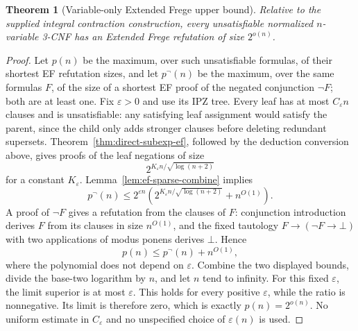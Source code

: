 \documentclass[11pt]{article}
\newtheorem{theorem}{Theorem}[section]
\theoremstyle{definition}
\theoremstyle{remark}
\begin{document}
\begin{theorem}[Variable-only Extended Frege upper bound]
\label{thm:all-3cnf-ef}
Relative to the supplied integral contraction construction, every
unsatisfiable normalized $n$-variable 3-CNF has an Extended Frege
refutation of size $2^{o(n)}$.
\end{theorem}
\begin{proof}
Let $p(n)$ be the maximum, over such unsatisfiable formulas, of
their shortest EF refutation sizes, and let $p^{\neg}(n)$ be the
maximum, over the same formulas $F$, of the size of a shortest EF
proof of the negated conjunction $\neg F$; both are at least one. Fix
$\varepsilon>0$ and use its IPZ tree. Every leaf has at most
$C_\varepsilon n$ clauses and is unsatisfiable: any satisfying
leaf assignment would satisfy the parent, since the child only
adds stronger clauses before deleting redundant supersets.
Theorem~\ref{thm:direct-subexp-ef}, followed by the deduction
conversion above, gives proofs of the leaf negations of size
\[
 2^{K_\varepsilon n/\sqrt{\log(n+2)}}
\]
for a constant $K_\varepsilon$. Lemma~\ref{lem:ef-sparse-combine}
implies
\[
 p^{\neg}(n)\le
 2^{\varepsilon n}
 \left(2^{K_\varepsilon n/\sqrt{\log(n+2)}}+n^{O(1)}\right).
\]
A proof of $\neg F$ gives a refutation from the clauses of $F$:
conjunction introduction derives $F$ from its clauses in size
$n^{O(1)}$, and the fixed tautology $F\to(\neg F\to\bot)$ with two
applications of modus ponens derives $\bot$. Hence
\[
 p(n)\le p^{\neg}(n)+n^{O(1)},
\]
where the polynomial does not depend on $\varepsilon$. Combine the
two displayed bounds, divide the base-two logarithm by $n$, and let
$n$ tend to infinity. For this fixed $\varepsilon$, the limit superior is
at most $\varepsilon$. This holds for every positive
$\varepsilon$, while the ratio is nonnegative. Its limit is
therefore zero, which is exactly $p(n)=2^{o(n)}$.
No uniform estimate in $C_\varepsilon$ and no unspecified
choice of $\varepsilon(n)$ is used.
\end{proof}
\end{document}
